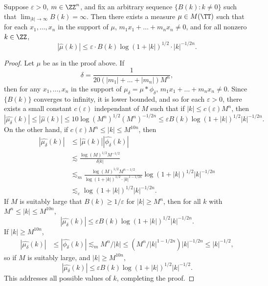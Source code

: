 \begin{lemma}
	Suppose $\varepsilon > 0$, $m \in \ZZ^n$, and fix an arbitrary sequence $\{ B(k) : k \neq 0 \}$ such that $\lim_{|k| \to \infty} B(k) = \infty$. Then there exists a measure $\mu \in M(\TT)$ such that for each $x_1, \dots, x_n$ in the support of $\mu$, $m_1 x_1 + \dots + m_n x_n \neq 0$, and for all nonzero $k \in \ZZ$,
	\[ |\widehat{\mu}(k)| \leq \varepsilon \cdot B(k) \log \left( 1 + |k| \right)^{1/2} \cdot |k|^{-1/2n}. \]
\end{lemma}
\begin{proof}
	Let $\mu$ be as in the proof above. If
	\[ \delta = \frac{1}{20 (|m_1| + \dots + |m_n|) M^n}, \]
	then for any $x_1, \dots, x_n$ in the support of $\mu_\delta = \mu * \phi_\delta$, $m_1 x_1 + \dots + m_n x_n \neq 0$. Since $\{ B(k) \}$ converges to infinity, it is lower bounded, and so for each $\varepsilon > 0$, there exists a small constant $c(\varepsilon)$ independant of $M$ such that if $|k| \leq c(\varepsilon) M^n$, then
	\[ |\widehat{\mu_\delta}(k)| \leq |\widehat{\mu}(k)| \leq 10 \log(M^n)^{1/2} (M^n)^{-1/2n} \leq \varepsilon B(k) \log(1 + |k|)^{1/2} |k|^{-1/2n}. \]
	On the other hand, if $c(\varepsilon) M^n \leq |k| \leq M^{10n}$, then
	\begin{align*}
		|\widehat{\mu_\delta}(k)| &\leq |\widehat{\mu}(k)| |\widehat{\phi_\delta}(k)|\\
		&\lesssim \frac{\log(M)^{1/2} M^{-1/2}}{\delta |k|}\\
		&\lesssim_m \frac{\log(M)^{1/2} M^{n-1/2}}{\log(1 + |k|)^{1/2} \cdot |k|^{1-1/2n}} \log(1 +|k|)^{1/2} |k|^{-1/2n}\\
		&\lesssim_\varepsilon \log(1 + |k|)^{1/2} |k|^{-1/2n}.
	\end{align*}
	If $M$ is suitably large that $B(k) \geq 1/\varepsilon$ for $|k| \geq M^n$, then for all $k$ with $M^n \leq |k| \leq M^{10n}$,
	\[ |\widehat{\mu_\delta}(k)| \leq \varepsilon B(k) \log(1 + |k|)^{1/2} |k|^{-1/2n}. \]
	If $|k| \geq M^{10n}$,
	\begin{align*}
		|\widehat{\mu_\delta}(k)| &\leq |\widehat{\phi_\delta}(k)| \lesssim_m M^n / |k| \leq (M^n / |k|^{1-1/2n}) |k|^{-1/2n} \leq |k|^{-1/2},
	\end{align*}
	so if $M$ is suitably large, and $|k| \geq M^{10n}$,
	\[  |\widehat{\mu_\delta}(k)| \leq \varepsilon B(k) \log(1 + |k|)^{1/2} |k|^{-1/2}. \]
	This addresses all possible values of $k$, completing the proof.
\end{proof}

